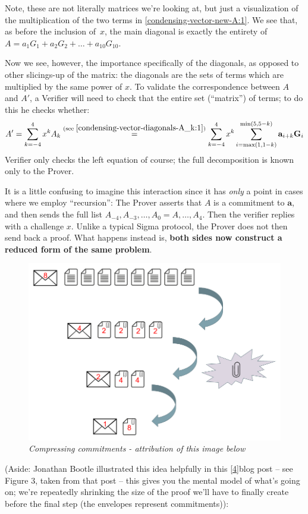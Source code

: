 \documentclass[10pt,a4paper]{article}
\begin{document}
Note, these are not literally matrices we're looking at, but just a
visualization of the multiplication of the two terms in \eqref{condensing-vector-new-A:1}.
We see that, as before the inclusion of~$x$, the main diagonal is exactly the entirety of 
$A = a_1G_1 + a_2G_2 + \ldots + a_{10}G_{10}$.

Now we see, however, the importance specifically of the diagonals, as
opposed to other slicings-up of the matrix: the diagonals are the sets
of terms which are multiplied by the same power of $x$. To validate the
correspondence between $A$ and $A'$, a Verifier will need to check that the
entire set (``matrix'') of terms; to do this he checks whether:
\begin{align*}
A' = \sum\limits_{k=-4}^{4}x^k A_k
   \stackrel{\text{(see }\eqref{condensing-vector-diagonals-A_k:1}\text{)}}{=} 
   \sum\limits_{k=-4}^{4}x^k\sum\limits_{i=\textrm{max}(1, 1-k)}^{\textrm{min}(5, 5-k)}
   \textbf{a}_{i+k}\textbf{G}_i
\end{align*}
Verifier only checks the left equation of course; the full decomposition is
known only to the Prover.

It is a little confusing to imagine this interaction since it has \emph{only} a point in cases where we employ ``recursion'':
The Prover asserts that $A$ is a commitment to $\mathbf{a}$, and then sends the full
list $A_{-4}, A_{-3}, \ldots, A_0=A, \ldots, A_{4}$. Then the verifier replies with a challenge $x$. Unlike a typical
Sigma protocol, the Prover does not then send back a proof. What happens
instead is, \textbf{both sides now construct a reduced form of the same
problem}.
\begin{figure}[h]
\centering
\includegraphics[scale=0.5]{images/bootlesavings.png}
\caption{\emph{Compressing commitments - attribution of this image below}}
\end{figure}
(Aside:
Jonathan Bootle illustrated this idea helpfully in this
{[}\protect\hyperlink{anchor-44}{4}{]}blog post -- see Figure 3, taken
from that post -- this gives you the mental model of what's going on;
we're repeatedly shrinking the size of the proof we'll have to finally
create before the final step (the envelopes represent commitments)):
\end{document}
